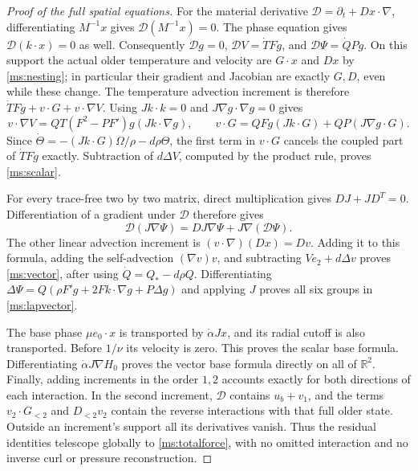 \begin{proof}[Proof of the full spatial equations]
For the material derivative $\mathcal D=\partial_t+Dx\cdot\nabla$,
differentiating $M^{-1}x$ gives $\mathcal D(M^{-1}x)=0$.
The phase equation gives $\mathcal D(k\cdot x)=0$ as well.
Consequently $\mathcal Dg=0$, $\mathcal DV=\dot T Fg$,
and $\mathcal D\Psi=\dot QPg$.
On this support the actual older temperature and velocity are
$G\cdot x$ and $Dx$ by \eqref{ms:nesting}; in particular their
gradient and Jacobian are exactly $G,D$, even while these change.
The temperature advection increment is therefore
$\dot T Fg+v\cdot G+v\cdot\nabla V$.
Using $Jk\cdot k=0$ and $J\nabla g\cdot\nabla g=0$ gives
\[
 v\cdot\nabla V=QT(F^2-PF')g(Jk\cdot\nabla g),\qquad
 v\cdot G=QFg(Jk\cdot G)+QP(J\nabla g\cdot G).
\]
Since $\dot\Theta=-(Jk\cdot G)\Omega/\rho-d\rho\Theta$,
the first term in $v\cdot G$ cancels the coupled part of
$\dot T Fg$ exactly. Subtraction of $d\Delta V$, computed
by the product rule, proves \eqref{ms:scalar}.

For every trace-free two by two matrix, direct multiplication
gives $DJ+JD^T=0$. Differentiation of a gradient under $\mathcal D$
therefore gives
\[
 \mathcal D(J\nabla\Psi)=D J\nabla\Psi+
                                  J\nabla(\mathcal D\Psi).
\]
The other linear advection increment is
$(v\cdot\nabla)(Dx)=Dv$. Adding it to this formula, adding the
self-advection $(\nabla v)v$, and subtracting $Ve_2+d\Delta v$
proves \eqref{ms:vector}, after using $\dot Q=Q_*-d\rho Q$.
Differentiating $\Delta\Psi=Q(\rho F'g+2Fk\cdot\nabla g+P\Delta g)$
and applying $J$ proves all six groups in \eqref{ms:lapvector}.

The base phase $\mu e_0\cdot x$ is transported by
$\dot\alpha Jx$, and its radial cutoff is also transported.
Before $1/\nu$ its velocity is zero. This proves the scalar
base formula. Differentiating $\dot\alpha J\nabla H_0$ proves
the vector base formula directly on all of $\mathbb R^2$.
Finally, adding increments in the order $1,2$ accounts exactly
for both directions of each interaction. In the second increment,
$\mathcal D$ contains $u_b+v_1$, and the terms $v_2\cdot G_{<2}$
and $D_{<2}v_2$ contain the reverse interactions with that full
older state. Outside an increment's support all its derivatives
vanish. Thus the residual identities telescope globally to
\eqref{ms:totalforce}, with no omitted interaction and no inverse
curl or pressure reconstruction.
\end{proof}

